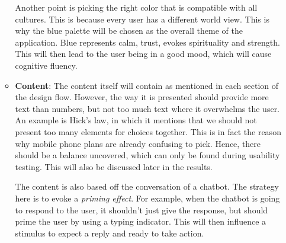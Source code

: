 \documentclass[conference]{IEEEtran}
\begin{document}
\begin{itemize}
\begin{itemize}
        Another point is picking the right color that is compatible with all cultures. This is because every user has a different world view. This is why the blue palette will be chosen as the overall theme of the application. Blue represents calm, trust, evokes spirituality and strength. This will then lead to the user being in a good mood, which will cause cognitive fluency.
        \item \textbf{Content}: The content itself will contain as mentioned in each section of the design flow. However, the way it is presented should provide more text than numbers, but not too much text where it overwhelms the user. An example is Hick's law, in which it mentions that we should not present too many elements for choices together. This is in fact the reason why mobile phone plans are already confusing to pick. Hence, there should be a balance uncovered, which can only be found during usability testing. This will also be discussed later in the results.
        
        The content is also based off the conversation of a chatbot. The strategy here is to evoke a \textit{priming effect}. For example, when the chatbot is going to respond to the user, it shouldn't just give the response, but should prime the user by using a typing indicator. This will then influence a stimulus to expect a reply and ready to take action. 
        

\end{itemize}
\end{itemize}
\end{document}

